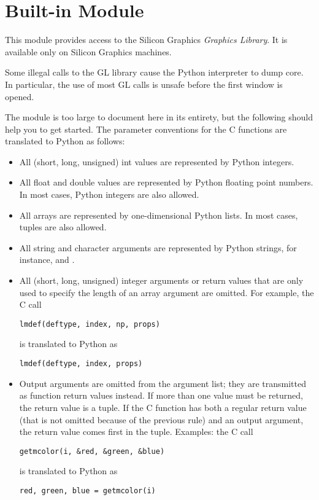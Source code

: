 \section{Built-in Module }
\label{module-gl}

This module provides access to the Silicon Graphics
\emph{Graphics Library}.
It is available only on Silicon Graphics machines.

Some illegal calls to the GL library cause the Python interpreter to dump
core.
In particular, the use of most GL calls is unsafe before the first
window is opened.

The module is too large to document here in its entirety, but the
following should help you to get started.
The parameter conventions for the C functions are translated to Python as
follows:

\begin{itemize}
\item
All (short, long, unsigned) int values are represented by Python
integers.
\item
All float and double values are represented by Python floating point
numbers.
In most cases, Python integers are also allowed.
\item
All arrays are represented by one-dimensional Python lists.
In most cases, tuples are also allowed.
\item
\begin{sloppypar}
All string and character arguments are represented by Python strings,
for instance,
and
.
\end{sloppypar}
\item
All (short, long, unsigned) integer arguments or return values that are
only used to specify the length of an array argument are omitted.
For example, the C call

\begin{verbatim}
lmdef(deftype, index, np, props)
\end{verbatim}
%
is translated to Python as

\begin{verbatim}
lmdef(deftype, index, props)
\end{verbatim}
%
\item
Output arguments are omitted from the argument list; they are
transmitted as function return values instead.
If more than one value must be returned, the return value is a tuple.
If the C function has both a regular return value (that is not omitted
because of the previous rule) and an output argument, the return value
comes first in the tuple.
Examples: the C call

\begin{verbatim}
getmcolor(i, &red, &green, &blue)
\end{verbatim}
%
is translated to Python as

\begin{verbatim}
red, green, blue = getmcolor(i)
\end{verbatim}
%
\end{itemize}


